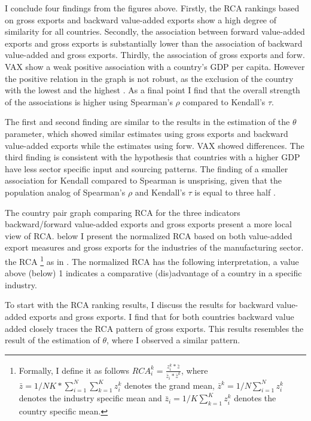 I conclude four findings from the figures above.
Firstly, the RCA rankings based on gross exports and backward value-added exports show a high degree of similarity for all countries.
Secondly, the association between forward value-added exports and gross exports is substantially lower than the association of backward value-added and gross exports.
Thirdly,  the association of gross exports and forw. VAX show a weak positive association with a country's GDP per capita.
However the positive relation in the graph is not robust, as the exclusion of the country with the lowest and the highest  .
As a final point I find that the overall strength of the associations is higher using  Spearman's $\rho$ compared to Kendall's $\tau$. \par
The first and second finding are similar to the results in the estimation of the $\theta$ parameter, which showed similar estimates using gross exports and backward value-added exports while the estimates using forw. VAX showed differences.
The third finding is consistent with the hypothesis   that countries with a higher GDP have less sector specific input and sourcing patterns.
The finding of a smaller association for Kendall compared to Spearman is unsprising, given that the population analog of Spearman's $\rho$ and Kendall's $\tau$ is equal to three half \parencite{fredricks2007}. \par
The country pair graph comparing RCA for the three indicators backward/forward value-added exports and gross exports present a more local view of RCA.
 below I present  the normalized RCA based on both value-added export measures and gross exports for the industries of the manufacturing sector.
the RCA \footnote{ Formally, I define it as follows $RCA_{i}^{k}=\frac{ z^k_i * \bar{z} }{\bar{z}_i * \bar{z}^k}$, where $\bar{z}=1/NK* \sum_{i=1}^N \sum_{k=1}^K z^k_i$ denotes the grand mean, $\bar{z}^k= 1/N \sum_{i=1}^N z^k_i$ denotes the industry specific mean and $\bar{z}_i= 1/K \sum_{k=1}^K z^k_i$ denotes the country specific mean.} as in \textcite{leromain2014}.
The normalized RCA has the following interpretation, a value above (below) 1 indicates a comparative (dis)advantage of a country in a specific industry.
 \par
To start with the RCA ranking results, I discuss the results for backward value-added exports and gross exports.
I find that for both countries backward value added closely traces the RCA pattern of gross exports.
This results resembles the result of the estimation of $\theta$, where I observed a similar pattern. \par
